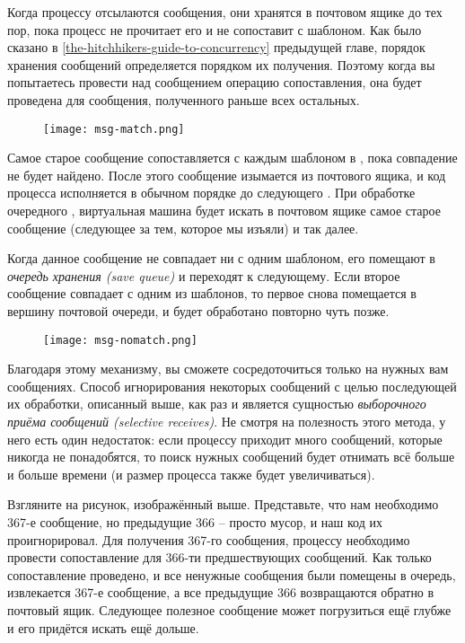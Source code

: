 Когда процессу отсылаются сообщения, они хранятся в почтовом ящике до тех пор, пока процесс не прочитает его и не сопоставит с шаблоном.
Как было сказано в \ref{the-hitchhikers-guide-to-concurrency} предыдущей главе, порядок хранения сообщений определяется  порядком их получения.
Поэтому когда вы попытаетесь провести над сообщением операцию сопоставления, она будет проведена для сообщения, полученного раньше всех остальных.
\begin{figure}[h!]
    \centering
    \texttt{[image: msg-match.png]}
\end{figure}

Самое старое сообщение сопоставляется с каждым шаблоном в , пока совпадение не будет найдено.
После этого сообщение изымается из почтового ящика, и код процесса исполняется в обычном порядке до следующего .
При обработке очередного , виртуальная машина будет искать в почтовом ящике самое старое сообщение (следующее за тем, которое мы изъяли) и так далее.

Когда данное сообщение не совпадает ни с одним шаблоном, его помещают в \emph{очередь хранения (save queue)} и переходят к следующему.
Если второе сообщение совпадает с одним из шаблонов, то первое снова помещается в вершину почтовой очереди, и будет обработано повторно чуть позже.
\begin{figure}[h!]
    \centering
    \texttt{[image: msg-nomatch.png]}
\end{figure}

Благодаря этому механизму, вы сможете сосредоточиться только на нужных вам сообщениях.
Способ игнорирования некоторых сообщений с целью последующей их обработки, описанный выше, как раз и является сущностью \emph{выборочного приёма сообщений (selective receives)}.
Не смотря на полезность этого метода, у него есть один недостаток: если процессу приходит много сообщений, которые никогда не понадобятся, то поиск нужных сообщений будет отнимать всё больше и больше времени (и размер процесса также будет увеличиваться).

Взгляните на рисунок, изображённый выше.
Представьте, что нам необходимо 367\--е сообщение, но предыдущие 366 \--- просто мусор, и наш код их проигнорировал.
Для получения 367\--го сообщения, процессу необходимо провести сопоставление для 366\--ти предшествующих сообщений.
Как только сопоставление проведено, и все ненужные сообщения были помещены в очередь, извлекается 367\--е сообщение, а все предыдущие 366 возвращаются обратно в почтовый ящик.
Следующее полезное сообщение может погрузиться ещё глубже и его придётся искать ещё дольше.

